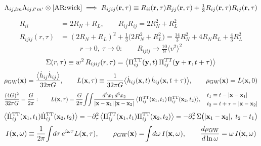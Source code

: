 \documentclass[10pt,prd,aps,nobibnotes,superscriptaddress,preprintnumbers,notitlepage]{revtex4-1}
\def \pa{\partial}
\newcommand{\xb}{{\bf x}}
\newcommand{\br}{{\bf r}}
\begin{document}
\begin{equation}
  \Lambda_{ij,lm}\Lambda_{ij,l'm'}\otimes\eqref{AR:wick}
  \;\Longrightarrow\;
  R_{ijij}(\br,\tau)\equiv
  R_{ii}(\br,\tau)R_{jj}(\br,\tau)+\tfrac13R_{ij}(\br,\tau)R_{ij}(\br,\tau)
  \label{AR:contract}
\end{equation}
\begin{align}
  R_{ii}&=2R_N+R_L,
  \qquad
  R_{ij}R_{ij}=2R_N^2+R_L^2
  \nonumber\\
  R_{ijij}(r,\tau)&=(2R_N+R_L)^2+\tfrac13\bigl(2R_N^2+R_L^2\bigr)
   =\tfrac{14}{3}R_N^2+4R_NR_L+\tfrac43R_L^2
  \label{AR:Rijij}
\end{align}
\begin{equation}
  r\to0,\ \tau\to0:\qquad
  R_{ijij}\to\tfrac{10}{9}\langle v^2\rangle^2
  \label{AR:Rijij0}
\end{equation}
\begin{equation}
  \Sigma(r,\tau)\equiv w^2\,R_{ijij}(r,\tau)
  =\bigl\langle\Pi^{\rm TT}_{ij}(\mathbf{y},t)\,\Pi^{\rm TT}_{ij}(\mathbf{y}+\br,t+\tau)\bigr\rangle
  \label{AR:Sigma}
\end{equation}
\begin{equation}
  \rho_{\rm GW}(\xb)=\frac{\bigl\langle\dot h_{ij}\dot h_{ij}\bigr\rangle}{32\pi G},
  \qquad
  L(\xb,\tau)\equiv\frac{1}{32\pi G}
  \bigl\langle\dot h_{ij}(\xb,t)\,\dot h_{ij}(\xb,t+\tau)\bigr\rangle,
  \qquad
  \rho_{\rm GW}(\xb)=L(\xb,0)
  \label{AR:L}
\end{equation}
\begin{equation}
  \frac{(4G)^2}{32\pi G}=\frac{G}{2\pi}:
  \qquad
  L(\xb,\tau)=\frac{G}{2\pi}\!\int\!\!\int\!
  \frac{d^3x_1\,d^3x_2}{|\xb-\xb_1|\,|\xb-\xb_2|}\,
  \bigl\langle\dot\Pi^{\rm TT}_{ij}(\xb_1,t_1)\,\dot\Pi^{\rm TT}_{ij}(\xb_2,t_2)\bigr\rangle,
  \quad
  \begin{aligned}
    t_1&=t-|\xb-\xb_1|\\
    t_2&=t+\tau-|\xb-\xb_2|
  \end{aligned}
  \label{AR:Lret}
\end{equation}
\begin{equation}
  \bigl\langle\dot\Pi^{\rm TT}_{ij}(\xb_1,t_1)\dot\Pi^{\rm TT}_{ij}(\xb_2,t_2)\bigr\rangle
  =-\pa_\tau^2\,\bigl\langle\Pi^{\rm TT}_{ij}(\xb_1,t_1)\Pi^{\rm TT}_{ij}(\xb_2,t_2)\bigr\rangle
  =-\pa_\tau^2\,\Sigma\bigl(|\xb_1-\xb_2|,\;t_2-t_1\bigr)
  \label{AR:ddot}
\end{equation}
\begin{equation}
  I(\xb,\omega)\equiv\frac{1}{2\pi}\!\int\!d\tau\,e^{i\omega\tau}L(\xb,\tau),
  \qquad
  \rho_{\rm GW}(\xb)=\!\int\!d\omega\,I(\xb,\omega),
  \qquad
  \frac{d\rho_{\rm GW}}{d\ln\omega}=\omega\,I(\xb,\omega)
  \label{AR:I}
\end{equation}
\end{document}
